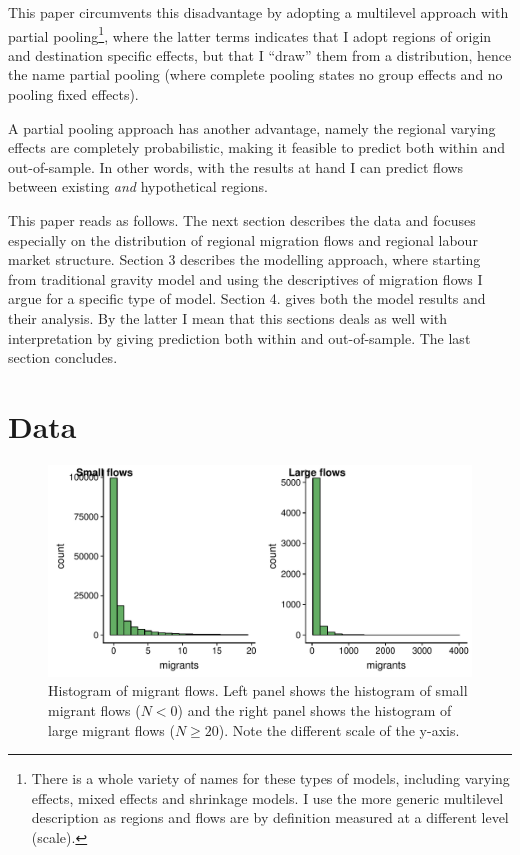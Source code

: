\documentclass[fleqn,10pt]{SelfArx} %
\begin{document}
        This paper circumvents this disadvantage by adopting a
        multilevel approach with partial pooling\footnote{There is a
          whole variety of names for these types of models, including
          varying effects, mixed effects and shrinkage models. I use
          the more generic multilevel description as regions and flows
          are by definition measured at a different level (scale).},
        where the latter terms indicates that I adopt regions of
        origin and destination specific effects, but that I ``draw''
        them from a distribution, hence the name partial pooling
        (where complete pooling states no group effects and no pooling
        fixed effects).

        A partial pooling approach has another advantage, namely the
        regional varying effects are completely probabilistic, making
        it feasible to predict both within and out-of-sample. In other
        words, with the results at hand I can predict flows between
        existing \emph{and} hypothetical regions.

        This paper reads as follows. The next section describes the
        data and focuses especially on the distribution of regional
        migration flows and regional labour market structure. Section
        3 describes the modelling approach, where starting from
        traditional gravity model and using the descriptives of
        migration flows I argue for a specific type of model. Section
        4. gives both the model results and their analysis. By the
        latter I mean that this sections deals as well with
        interpretation by giving prediction both within and
        out-of-sample. The last section concludes.

        \section{Data}

              \begin{figure}[ht!]\centering %
          \includegraphics[width=0.8\linewidth]{../fig/hist_mig.pdf}
          \caption{Histogram of migrant flows. Left panel shows the
            histogram of small migrant flows ($N<0$) and the right
            panel shows the histogram of large migrant flows
            ($N \geq 20$). Note the different scale of the y-axis.}
          \label{fig:hist_mig}
        \end{figure}
\end{document}
